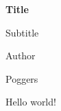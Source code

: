 \documentclass[11pt, a4paper]{report}
\newcommand{\titlevar}{Title}
\begin{document}
	
\begin{titlepage}
	\begin{center}
		\vspace*{1cm}
		\Huge
		\textbf{\titlevar}

		\large
		\vspace{0.5cm}
		Subtitle

		\vspace{0.5cm}
		Author

		\vfill
		
		Poggers
	\end{center}

\end{titlepage}
	
Hello world!
\end{document}
